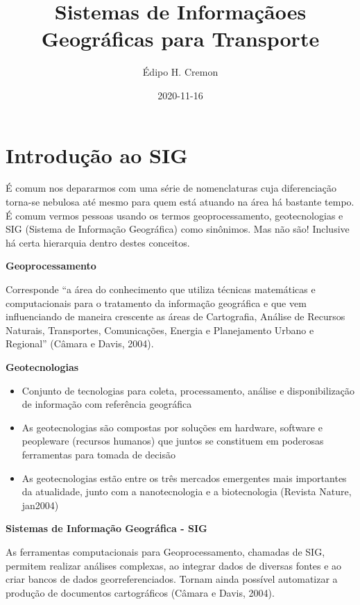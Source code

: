 \documentclass[
]{book}
\title{Sistemas de Informaçãoes Geográficas para Transporte}
\author{Édipo H. Cremon}
\date{2020-11-16}
\begin{document}
\maketitle

{
\setcounter{tocdepth}{1}
\tableofcontents
}
\hypertarget{introduuxe7uxe3o-ao-sig}{%
\chapter{Introdução ao SIG}\label{introduuxe7uxe3o-ao-sig}}

É comum nos depararmos com uma série de nomenclaturas cuja diferenciação torna-se nebulosa até mesmo para quem está atuando na área há bastante tempo. É comum vermos pessoas usando os termos geoprocessamento, geotecnologias e SIG (Sistema de Informação Geográfica) como sinônimos. Mas não são! Inclusive há certa hierarquia dentro destes conceitos.

\textbf{Geoprocessamento}

Corresponde ``a área do conhecimento que utiliza técnicas matemáticas e computacionais para o tratamento da informação geográfica e que vem influenciando de maneira crescente as áreas de Cartografia, Análise de Recursos Naturais, Transportes, Comunicações, Energia e Planejamento Urbano e Regional'' (Câmara e Davis, 2004).

\textbf{Geotecnologias}

\begin{itemize}
\item
  Conjunto de tecnologias para coleta, processamento, análise e disponibilização de informação com referência geográfica
\item
  As geotecnologias são compostas por soluções em hardware, software e peopleware (recursos humanos) que juntos se constituem em poderosas ferramentas para tomada de decisão
\item
  As geotecnologias estão entre os três mercados emergentes mais importantes da atualidade, junto com a nanotecnologia e a biotecnologia (Revista Nature, jan2004)
\end{itemize}

\textbf{Sistemas de Informação Geográfica - SIG}

As ferramentas computacionais para Geoprocessamento, chamadas de SIG, permitem realizar análises complexas, ao integrar dados de diversas fontes e ao criar bancos de dados georreferenciados. Tornam ainda possível automatizar a produção de documentos cartográficos (Câmara e Davis, 2004).
\end{document}
